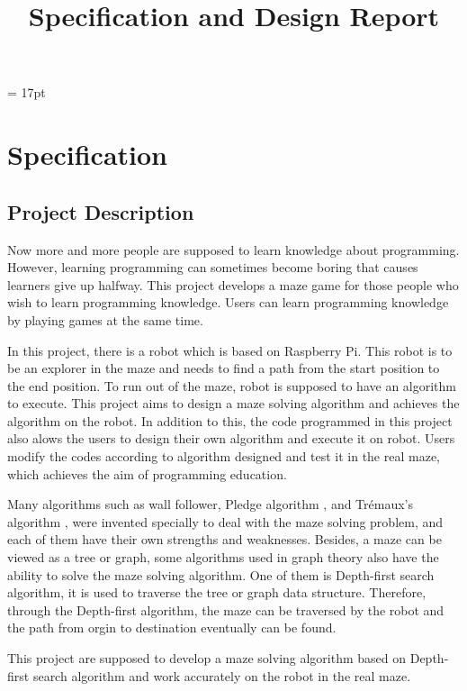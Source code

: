 \documentclass[11pt,times,oneside,openright,hardcopy]{eeereport}
\title{Specification and Design Report}
\subtitle{}
\begin{document}
\baselineskip = 17pt
\begin{titlepage}

\newpage
\thispagestyle{empty}
\end{titlepage}

\frontmatter
\mainmatter
{}


\chapter{Specification}\label{cpt:spec}

\section{Project Description}
Now more and more people are supposed to learn knowledge about programming. However, learning programming can sometimes become boring that causes learners give up halfway.
This project develops a maze game for those people who wish to learn programming knowledge. Users can learn programming knowledge by playing games at the same time.

In this project, there is a robot which is based on Raspberry Pi. This robot is to be an explorer in the maze and needs to find a path from the start position to the end position.
To run out of the maze, robot is supposed to have an algorithm to execute. This project aims to design a maze solving algorithm and achieves the algorithm on the robot.
In addition to this, the code programmed in this project also alows the users to design their own algorithm and execute it on robot. Users modify the codes according to algorithm designed and test it in the real maze, which achieves the aim of programming education.

Many algorithms such as wall follower, Pledge algorithm \cite{Klein:2011hi}, and Trémaux's algorithm \cite{Anonymous:2007ch}, were invented specially to deal with the maze solving problem, and each of them have their own strengths and weaknesses.
Besides, a maze can be viewed as a tree or graph, some algorithms used in graph theory also have the ability to solve the maze solving algorithm. One of them is Depth-first search algorithm, it is used to traverse the tree or graph data structure. Therefore, through the Depth-first algorithm, the maze can be traversed by the robot and the path from orgin to destination eventually can be found.

This project are supposed to develop a maze solving algorithm based on Depth-first search algorithm and work accurately on the robot in the real maze.
\end{document}
